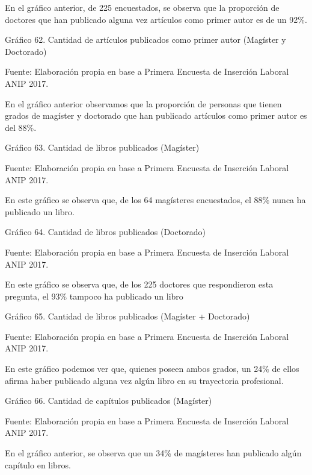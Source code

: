 \documentclass{article}
\begin{document}
En el gráfico anterior, de 225 encuestados, se observa que la proporción de doctores que han publicado alguna vez artículos como primer autor es de un 92\%.

Gráfico 62. Cantidad de artículos publicados como primer autor (Magíster y Doctorado)


Fuente: Elaboración propia en base a Primera Encuesta de Inserción Laboral ANIP 2017.

En el gráfico anterior observamos que la proporción de personas que tienen grados de magíster y doctorado que han publicado artículos como primer autor es del 88\%.

Gráfico 63. Cantidad de libros publicados (Magíster)


Fuente: Elaboración propia en base a Primera Encuesta de Inserción Laboral ANIP 2017.

En este gráfico se observa que, de los 64 magísteres encuestados, el 88\% nunca ha publicado un libro.

Gráfico 64. Cantidad de libros publicados (Doctorado)


Fuente: Elaboración propia en base a Primera Encuesta de Inserción Laboral ANIP 2017.

En este gráfico se observa que, de los 225 doctores que respondieron esta pregunta, el 93\% tampoco ha publicado un libro

Gráfico 65. Cantidad de libros publicados (Magíster + Doctorado)


Fuente: Elaboración propia en base a Primera Encuesta de Inserción Laboral ANIP 2017.

En este gráfico podemos ver que, quienes poseen ambos grados, un 24\% de ellos afirma haber publicado alguna vez algún libro en su trayectoria profesional.

Gráfico 66. Cantidad de capítulos publicados (Magíster)


Fuente: Elaboración propia en base a Primera Encuesta de Inserción Laboral ANIP 2017.

En el gráfico anterior, se observa que un 34\% de magísteres han publicado algún capítulo en libros.
\end{document}
